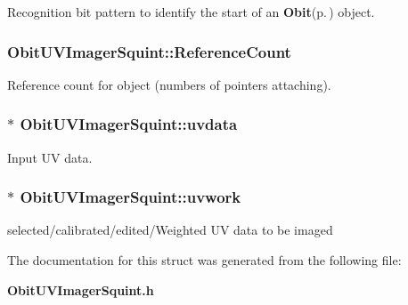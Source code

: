 Recognition bit pattern to identify the start of an {\bf Obit}{\rm (p.\,\pageref{structObit})} object. 

\subsubsection{ {\bf Obit\-UVImager\-Squint::Reference\-Count}}\label{structObitUVImagerSquint_o2}


Reference count for object (numbers of pointers attaching). 

\subsubsection{$\ast$ {\bf Obit\-UVImager\-Squint::uvdata}}\label{structObitUVImagerSquint_o4}


Input UV data. 

\subsubsection{$\ast$ {\bf Obit\-UVImager\-Squint::uvwork}}\label{structObitUVImagerSquint_o5}


selected/calibrated/edited/Weighted UV data to be imaged 



The documentation for this struct was generated from the following file:\begin{CompactItemize}
\item 
{\bf Obit\-UVImager\-Squint.h}\end{CompactItemize}
